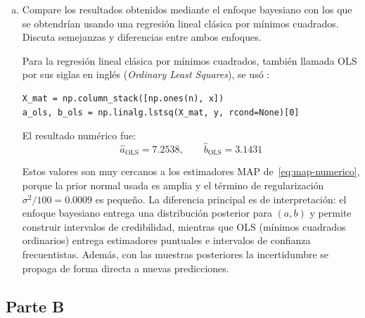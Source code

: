 \documentclass[a4paper]{article}
\begin{document}
\begin{enumerate}[a)]
    
    \item Compare los resultados obtenidos mediante el enfoque bayesiano con los que se obtendrían usando una regresión lineal clásica por mínimos cuadrados. Discuta semejanzas y diferencias entre ambos enfoques.
    
    Para la regresión lineal clásica por mínimos cuadrados, también llamada OLS por sus siglas en inglés (\textit{Ordinary Least Squares}), se usó \cite{devore2008}:
\begin{lstlisting}
X_mat = np.column_stack([np.ones(n), x])
a_ols, b_ols = np.linalg.lstsq(X_mat, y, rcond=None)[0]
\end{lstlisting}

El resultado numérico fue:
\begin{equation}
  \hat a_{\text{OLS}} = 7.2538, \qquad
  \hat b_{\text{OLS}} = 3.1431
\end{equation}

Estos valores son muy cercanos a los estimadores MAP de~\eqref{eq:map-numerico},
porque la prior normal usada es amplia y el término de regularización
$\sigma^2/100=0.0009$ es pequeño. La diferencia principal es de
interpretación: el enfoque bayesiano entrega una distribución posterior
para $(a,b)$ y permite construir intervalos de credibilidad, mientras que
OLS (mínimos cuadrados ordinarios) entrega estimadores puntuales e intervalos de confianza frecuentistas.
Además, con las muestras posteriores la incertidumbre se propaga de forma
directa a nuevas predicciones.
\end{enumerate}

\subsection{Parte B}
\end{document}
